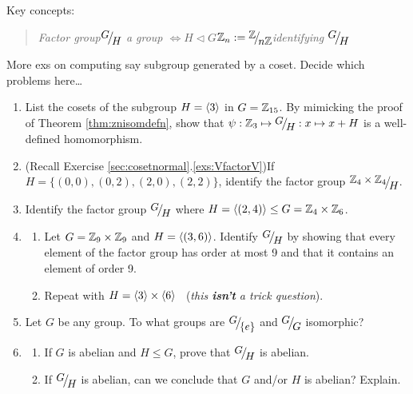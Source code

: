 \begin{exercises}
	Key concepts:
	\begin{quote}
		\emph{Factor group\qquad $\quotient GH$ a group $\iff H\triangleleft G$\qquad $\Z_n:=\quotient{\Z}{n\Z}$\qquad identifying $\quotient GH$}
	\end{quote}
	
	More exs on computing say subgroup generated by a coset. Decide which problems here\ldots
	
	\begin{enumerate}
	  \item List the cosets of the subgroup $H=\left\langle 3\right\rangle$ in $G=\mathbb{Z}_{15}$. By mimicking the proof of Theorem \ref{thm:znisomdefn}, show that $\psi:\Z_3\mapsto \quotient GH:x\mapsto x+H$ is a well-defined homomorphism.
	
		
		\item  (Recall Exercise \ref*{sec:cosetnormal}.\ref{exs:VfactorV})\lstsp If $H=\bigl\{(0,0),(0,2),(2,0),(2,2)\bigr\}$, identify the factor group $\quotient{\Z_4\times\Z_4}H$.
		
		
		\item Identify the factor group $\quotient GH$ where $H=\left\langle (2,4)\right\rangle\le G=\mathbb{Z}_4\times\mathbb{Z}_6$.
		
		
		\item\begin{enumerate}
		  \item Let $G=\mathbb{Z}_9\times\mathbb{Z}_9$ and $H=\left\langle (3,6)\right\rangle$. Identify $\quotient GH$ by showing that every element of the factor group has order at most 9 and that it contains an element of order 9.
		  
		  \item Repeat with $H=\left\langle 3\right\rangle\times\left\langle 6\right\rangle$ \ (\emph{this \textbf{isn't} a trick question}).
		\end{enumerate}
	  
	  
		\item Let $G$ be any group. To what groups are $\quotient G{\{e\}}$ and $\quotient GG$ isomorphic?
		
	
		\item\label{exs:gmodhabelian}\begin{enumerate}
		  \item If $G$ is abelian and $H\le G$, prove that $\quotient GH$ is abelian.
		  
		  \item If $\quotient GH$ is abelian, can we conclude that $G$ and/or $H$ is abelian? Explain.
		\end{enumerate}
		

\end{enumerate}
\end{exercises}
